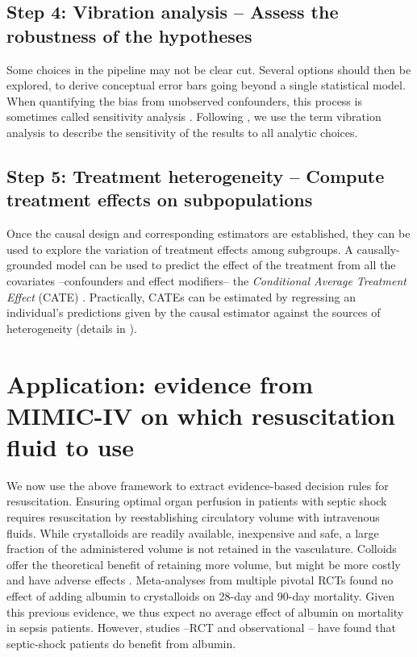 \documentclass[10pt,letterpaper]{article}
\begin{document}
\subsection*{Step 4: Vibration analysis -- Assess the robustness of the hypotheses}\label{sec:vibration_analysis}

Some choices in the pipeline may not be clear cut. Several options should then
be explored, to derive conceptual error bars going beyond a single statistical
model. When quantifying the bias from unobserved confounders, this process is
sometimes called sensitivity analysis \cite{schneeweiss2006sensitivity,thabane2013tutorial,fda_statistical_2021}.
Following \cite{patel2015assessment}, we use the term vibration analysis to
describe the sensitivity of the results to all analytic choices.

\subsection*{Step 5: Treatment heterogeneity -- Compute treatment effects on subpopulations}\label{sec:treatment_heterogeneity}

Once the causal design and corresponding estimators are established, they can be
used to explore the variation of treatment effects among subgroups. A
causally-grounded model can be used to predict the effect of the treatment from
all the covariates --confounders and effect modifiers-- the \emph{Conditional Average
  Treatment Effect} (CATE) \cite{robertson2021assessing}. Practically, CATEs can be estimated by regressing
an individual's predictions given by the causal estimator against the sources of
heterogeneity (details in ).


\section*{Application: evidence from MIMIC-IV on which resuscitation fluid to use}%
\label{sec:application_on_mimic_iv}

We now use the above framework to extract evidence-based decision rules for
resuscitation. Ensuring optimal organ perfusion in patients with septic shock
requires resuscitation by reestablishing circulatory volume with intravenous
fluids. While crystalloids are readily available, inexpensive and safe, a
large fraction of the administered volume is not retained in the vasculature.
Colloids offer the theoretical benefit of retaining more volume, but might be
more costly and have adverse effects \cite{annane2013effects}. Meta-analyses
from multiple pivotal RCTs found no effect of adding albumin to crystalloids
\cite{xu2014comparison,li2020resuscitation} on 28-day and 90-day mortality.  Given this
previous evidence, we thus expect no average effect of albumin on mortality in
sepsis patients. However, studies --RCT \cite{caironi2014albumin}  and observational
\cite{zhou2021early}-- have
found that septic-shock patients do benefit from albumin.
\end{document}
